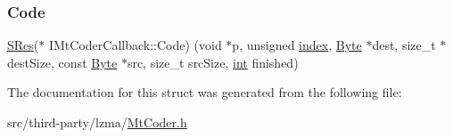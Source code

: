 \subsubsection{\texorpdfstring{Code}{Code}}
{\footnotesize\ttfamily \mbox{\hyperlink{7z_types_8h_acc0053eeb62726b68b22e8c7d9e91367}{S\+Res}}($\ast$ I\+Mt\+Coder\+Callback\+::\+Code) (void $\ast$p, unsigned \mbox{\hyperlink{isa-lr35902_8c_ac9ee548085af12859cb52a6c757cf73a}{index}}, \mbox{\hyperlink{7z_types_8h_ae3a497195d617519e5353ea7b417940f}{Byte}} $\ast$dest, size\+\_\+t $\ast$dest\+Size, const \mbox{\hyperlink{7z_types_8h_ae3a497195d617519e5353ea7b417940f}{Byte}} $\ast$src, size\+\_\+t src\+Size, \mbox{\hyperlink{ioapi_8h_a787fa3cf048117ba7123753c1e74fcd6}{int}} finished)}



The documentation for this struct was generated from the following file\+:\begin{DoxyCompactItemize}
\item 
src/third-\/party/lzma/\mbox{\hyperlink{_mt_coder_8h}{Mt\+Coder.\+h}}\end{DoxyCompactItemize}
